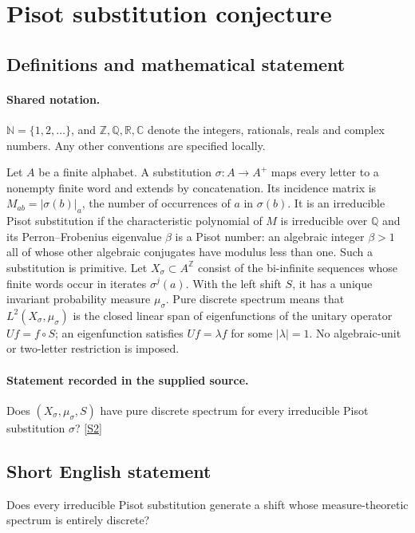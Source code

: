 \documentclass[11pt]{article}
\newcommand{\sref}[2]{\hyperlink{source:#1:#2}{[S#2]}}
\begin{document}
\section{Pisot substitution conjecture}\label{statement}

\subsection{Definitions and mathematical statement}

\paragraph{Shared notation.}$\mathbb N=\{1,2,\ldots\}$, and $\mathbb Z,\mathbb Q,\mathbb R,\mathbb C$ denote the integers, rationals, reals and complex numbers. Any other conventions are specified locally.


Let $A$ be a finite alphabet. A substitution $\sigma:A\to A^+$ maps every letter to a nonempty finite word and extends by concatenation. Its incidence matrix is $M_{ab}=|\sigma(b)|_a$, the number of occurrences of $a$ in $\sigma(b)$. It is an irreducible Pisot substitution if the characteristic polynomial of $M$ is irreducible over $\mathbb Q$ and its Perron--Frobenius eigenvalue $\beta$ is a Pisot number: an algebraic integer $\beta>1$ all of whose other algebraic conjugates have modulus less than one. Such a substitution is primitive. Let $X_\sigma\subset A^{\mathbb Z}$ consist of the bi-infinite sequences whose finite words occur in iterates $\sigma^j(a)$. With the left shift $S$, it has a unique invariant probability measure $\mu_\sigma$. Pure discrete spectrum means that $L^2(X_\sigma,\mu_\sigma)$ is the closed linear span of eigenfunctions of the unitary operator $Uf=f\circ S$; an eigenfunction satisfies $Uf=\lambda f$ for some $|\lambda|=1$. No algebraic-unit or two-letter restriction is imposed.
\paragraph{Statement recorded in the supplied source.}
Does $(X_\sigma,\mu_\sigma,S)$ have pure discrete spectrum for every irreducible Pisot substitution $\sigma$? \sref{statement}{2}
\subsection{Short English statement}
Does every irreducible Pisot substitution generate a shift whose measure-theoretic spectrum is entirely discrete?
\end{document}
